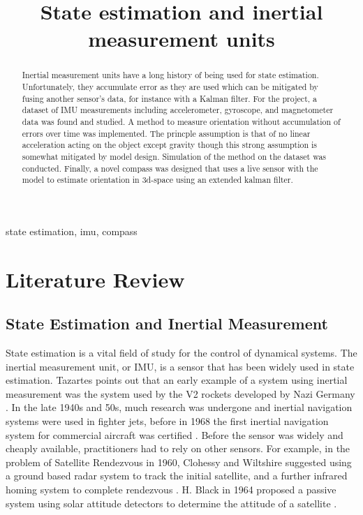 \documentclass[conference]{IEEEtran}
\begin{document}
\title{State estimation and inertial measurement units\\
}

\author{
}

\maketitle

\begin{abstract}
Inertial measurement units have a long history of being used for state estimation. Unfortunately, they accumulate error as they are used which can be mitigated by fusing another sensor's data, for instance with a Kalman filter. For the project, a dataset of IMU measurements including accelerometer, gyroscope, and magnetometer data was found and studied. A method to measure orientation without accumulation of errors over time was implemented. The princple assumption is that of no linear acceleration acting on the object except gravity though this strong assumption is somewhat mitigated by model design. Simulation of the method on the dataset was conducted. Finally, a novel compass was designed that uses a live sensor with the model to estimate orientation in 3d-space using an extended kalman filter.
\end{abstract}

\begin{IEEEkeywords}
state estimation, imu, compass
\end{IEEEkeywords}

\section{Literature Review}
\subsection{State Estimation and Inertial Measurement}
State estimation is a vital field of study for the control of dynamical systems. The inertial measurement unit, or IMU, is a sensor that has been widely used in state estimation.
Tazartes points out that an early example of a system using inertial measurement was the system used by the V2 rockets developed by Nazi Germany \cite{b1}. In the late 1940s and 50s, much research
was undergone and inertial navigation systems were used in fighter jets, before in 1968 the first inertial navigation system for commercial aircraft was certified \cite{b1}. Before the sensor was widely and cheaply available,
practitioners had to rely on other sensors. For example, in the problem of Satellite Rendezvous in 1960, Clohessy and Wiltshire suggested using a ground based radar system to track the initial satellite,
and a further infrared homing system to complete rendezvous \cite{b2}. H. Black in 1964 proposed a passive system using solar attitude detectors to determine the attitude of a satellite \cite{b3}.
\end{document}
